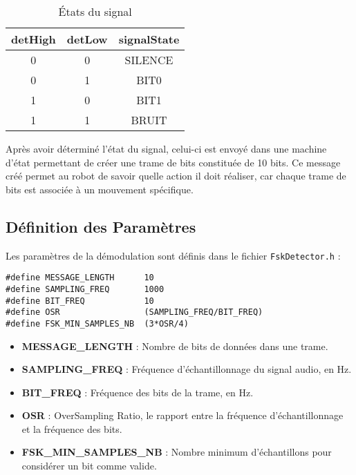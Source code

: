 \begin{table}[h]
\centering
\begin{tabular}{|c|c|c|}
\hline
\textbf{detHigh} & \textbf{detLow} & \textbf{signalState} \\ \hline
0                & 0               & SILENCE              \\ \hline
0                & 1               & BIT0                 \\ \hline
1                & 0               & BIT1                 \\ \hline
1                & 1               & BRUIT                \\ \hline
\end{tabular}
\caption{États du signal}
\label{tab:signal_states}
\end{table}

Après avoir déterminé l'état du signal, celui-ci est envoyé dans une machine d'état permettant de créer une trame de bits constituée de 10 bits. Ce message créé permet au robot de savoir quelle action il doit réaliser, car chaque trame de bits est associée à un mouvement spécifique.

\subsection{Définition des Paramètres}

Les paramètres de la démodulation sont définis dans le fichier \texttt{FskDetector.h} :

\begin{verbatim}
#define MESSAGE_LENGTH      10
#define SAMPLING_FREQ       1000
#define BIT_FREQ            10
#define OSR                 (SAMPLING_FREQ/BIT_FREQ)
#define FSK_MIN_SAMPLES_NB  (3*OSR/4)
\end{verbatim}

\begin{itemize}
    \item \textbf{MESSAGE\_LENGTH} : Nombre de bits de données dans une trame.
    \item \textbf{SAMPLING\_FREQ} : Fréquence d'échantillonnage du signal audio, en Hz.
    \item \textbf{BIT\_FREQ} : Fréquence des bits de la trame, en Hz.
    \item \textbf{OSR} : OverSampling Ratio, le rapport entre la fréquence d'échantillonnage et la fréquence des bits.
    \item \textbf{FSK\_MIN\_SAMPLES\_NB} : Nombre minimum d'échantillons pour considérer un bit comme valide.
\end{itemize}

